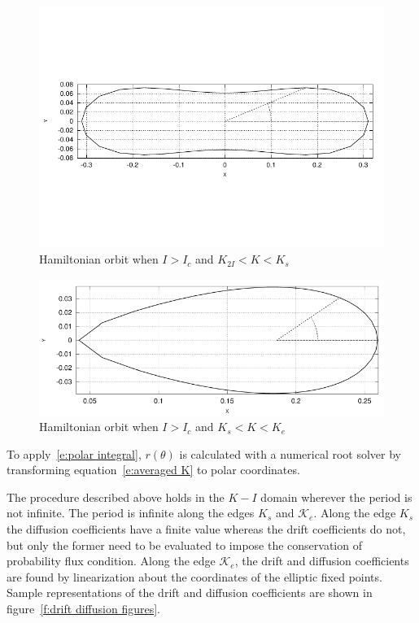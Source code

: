 \begin{figure}
\begin{center}
\includegraphics[width=\textwidth]{figures/orbit_theta_sup_1}
\caption{Hamiltonian orbit when $I>I_c$ and $K_{2I}<
K < K_s$}
\label{f:orbit_theta_sup_1}
\end{center}
\end{figure}

\begin{figure}
\begin{center}
\includegraphics[width=\textwidth]{figures/orbit_theta_sup_2_cropped}
\caption{Hamiltonian orbit when $I>I_c$ and $K_s< K < K_e$}
\label{f:orbit_theta_sup_2}
\end{center}
\end{figure}

To apply~\eqref{e:polar integral}, $r(\theta)$ is calculated with a numerical root solver by transforming equation~\eqref{e:averaged K} to polar coordinates.

The procedure described above holds in the $K-I$ domain wherever the period is not infinite. The period is infinite along the edges $K_s$ and $\mathcal{K }_e$. Along the edge $K_s$ the diffusion coefficients have a finite value whereas the drift coefficients do not, but only the former need to be evaluated to impose the conservation of probability flux condition. Along the edge $\mathcal{K}_e$, the drift and diffusion coefficients are found by linearization about the coordinates of the elliptic fixed points. Sample representations of the drift and diffusion coefficients are shown in figure~\ref{f:drift diffusion figures}.

